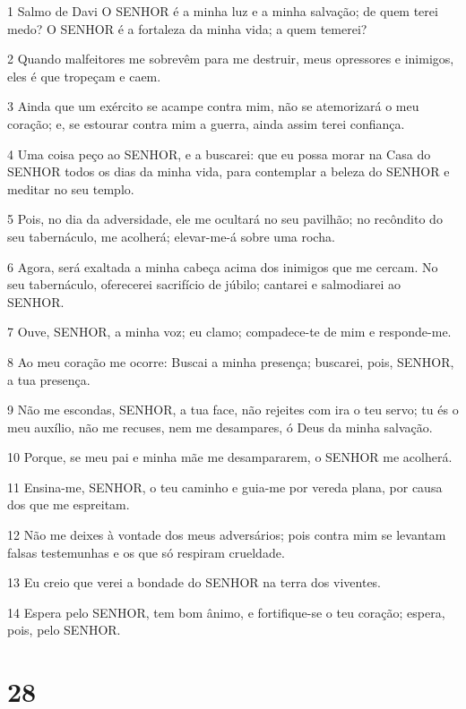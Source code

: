 \par 1 Salmo de Davi O SENHOR é a minha luz e a minha salvação; de quem terei medo? O SENHOR é a fortaleza da minha vida; a quem temerei?
\par 2 Quando malfeitores me sobrevêm para me destruir, meus opressores e inimigos, eles é que tropeçam e caem.
\par 3 Ainda que um exército se acampe contra mim, não se atemorizará o meu coração; e, se estourar contra mim a guerra, ainda assim terei confiança.
\par 4 Uma coisa peço ao SENHOR, e a buscarei: que eu possa morar na Casa do SENHOR todos os dias da minha vida, para contemplar a beleza do SENHOR e meditar no seu templo.
\par 5 Pois, no dia da adversidade, ele me ocultará no seu pavilhão; no recôndito do seu tabernáculo, me acolherá; elevar-me-á sobre uma rocha.
\par 6 Agora, será exaltada a minha cabeça acima dos inimigos que me cercam. No seu tabernáculo, oferecerei sacrifício de júbilo; cantarei e salmodiarei ao SENHOR.
\par 7 Ouve, SENHOR, a minha voz; eu clamo; compadece-te de mim e responde-me.
\par 8 Ao meu coração me ocorre: Buscai a minha presença; buscarei, pois, SENHOR, a tua presença.
\par 9 Não me escondas, SENHOR, a tua face, não rejeites com ira o teu servo; tu és o meu auxílio, não me recuses, nem me desampares, ó Deus da minha salvação.
\par 10 Porque, se meu pai e minha mãe me desampararem, o SENHOR me acolherá.
\par 11 Ensina-me, SENHOR, o teu caminho e guia-me por vereda plana, por causa dos que me espreitam.
\par 12 Não me deixes à vontade dos meus adversários; pois contra mim se levantam falsas testemunhas e os que só respiram crueldade.
\par 13 Eu creio que verei a bondade do SENHOR na terra dos viventes.
\par 14 Espera pelo SENHOR, tem bom ânimo, e fortifique-se o teu coração; espera, pois, pelo SENHOR.

\chapter{28}

